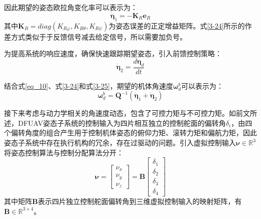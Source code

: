 因此期望的姿态欧拉角变化率可以表示为：
\begin{equation}
    \dot{\boldsymbol{\eta}}_1=-\boldsymbol{K}_R\boldsymbol{e}_R
    \label{3-24}
\end{equation}
其中$\boldsymbol{K}_R=diag({K}_{R\varphi},{K}_{R\theta},{K}_{R\psi})$为姿态误差的正定增益矩阵。式\eqref{3-24}所示的作差方式类似于于反馈信号减去给定信号，所以需要加负号。

为提高系统的响应速度，确保快速跟踪期望姿态，引入前馈控制策略：
\begin{equation}
    \dot{\boldsymbol{\eta}}_2=\frac{d\boldsymbol{\eta}_d}{dt}
    \label{3-25}
\end{equation}

结合式\eqref{eq_10}、式\eqref{3-24}和式\eqref{3-25}，期望的机体角速度$\boldsymbol\omega^{b}_d$可以表示为：
\begin{equation}
    \boldsymbol{\omega}^{b}_d=\boldsymbol{Q}^{-1}( \dot{\boldsymbol{\eta}}_1+ \dot{\boldsymbol{\eta}}_2)
    \label{3-26}
\end{equation}

接下来考虑与动力学相关的角速度动态，包含了可控力矩与不可控力矩。如前文所述，DFUAV姿态子系统的控制输入为四片相互独立的控制舵面的偏转角$\delta_i$，由四个偏转角度的组合产生用于控制机体姿态的俯仰力矩、滚转力矩和偏航力矩，因此姿态子系统中存在执行机构的冗余，存在过驱动的问题。引入虚拟控制输入$\boldsymbol{\nu}\in\mathbb{R}^3$将姿态控制算法与控制分配算法分开：
\begin{equation}
    \boldsymbol{\nu}=
    \begin{bmatrix}
    {\nu}_x \\ {\nu}_y \\ {\nu}_z
    \end{bmatrix}=\boldsymbol{B}
    \begin{bmatrix}
    \delta_1 \\ \delta_2 \\ \delta_3 \\ \delta_4
    \end{bmatrix}
    \label{3-27}
\end{equation}
其中矩阵$\boldsymbol{B}$表示四片独立控制舵面偏转角到三维虚拟控制输入的映射矩阵，有$\boldsymbol{B}\in\mathbb{R}^{3\times4}$。

